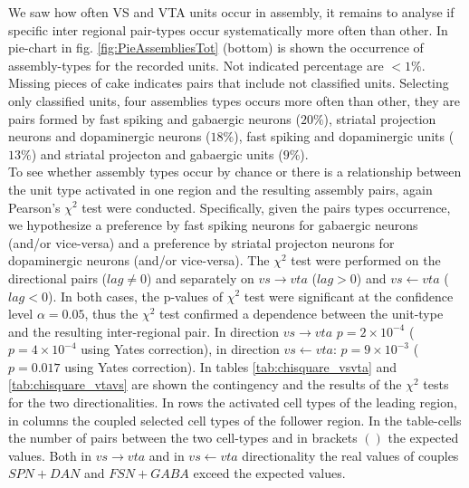  We saw how often VS and VTA units occur in assembly, it remains to analyse if specific inter regional pair-types occur systematically more often than other. In pie-chart in fig. \ref{fig:PieAssembliesTot} (bottom) is shown the occurrence of assembly-types for the recorded units. Not indicated percentage are $<1\%$. Missing pieces of cake indicates pairs that include not classified units. Selecting only classified units, four assemblies types occurs more often than other, they are pairs formed by fast spiking and gabaergic neurons ($20\%$), striatal projection neurons and dopaminergic neurons ($18\%$), fast spiking and dopaminergic units ($13\%$) and striatal projecton and gabaergic units ($9\%$).\\
To see whether assembly types occur by chance or there is a relationship between the unit type activated in one region and the resulting assembly pairs, again Pearson's $\chi^2$ test were conducted. Specifically, given the pairs types occurrence, we hypothesize a preference by fast spiking neurons for gabaergic neurons (and/or vice-versa) and a preference by striatal projecton neurons for dopaminergic neurons (and/or vice-versa). The $\chi^2$ test were performed on the directional pairs ($lag\neq0$) and separately on $vs\rightarrow vta$ ($lag>0$) and $vs \leftarrow vta$ ($lag<0$). In both cases, the p-values of $\chi^2$ test were significant at the confidence level $\alpha = 0.05$, thus the $\chi^2$ test confirmed a dependence between the unit-type and the resulting inter-regional pair. In direction $vs\rightarrow vta$ $p=2\times10^{-4}$ ($p=4\times10^{-4}$ using Yates correction), in direction $vs \leftarrow vta$: $p=9\times10^{-3}$ ($p=0.017$ using Yates correction). In tables \ref{tab:chisquare_vsvta} and \ref{tab:chisquare_vtavs} are shown the contingency and the results of the $\chi^2$ tests for the two directionalities. In rows the activated cell types of the leading region, in columns the coupled selected cell types of the follower region. In the table-cells the number of pairs between the two cell-types and in brackets $()$ the expected values. Both in $vs\rightarrow vta$ and in $vs\leftarrow vta$ directionality the real values of couples $SPN+DAN$ and $FSN+GABA$ exceed the expected values.\\ 
